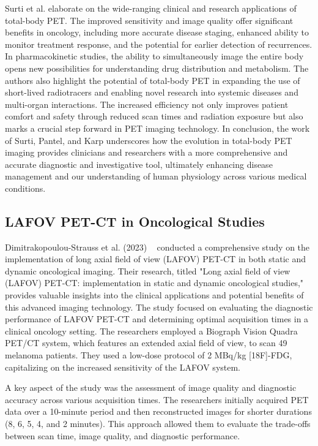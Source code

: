 Surti et al. \cite{surti2020} elaborate on the wide-ranging clinical and research applications of total-body PET. The improved sensitivity and image quality offer significant benefits in oncology, including more accurate disease staging, enhanced ability to monitor treatment response, and the potential for earlier detection of recurrences. In pharmacokinetic studies, the ability to simultaneously image the entire body opens new possibilities for understanding drug distribution and metabolism.
The authors also highlight the potential of total-body PET in expanding the use of short-lived radiotracers and enabling novel research into systemic diseases and multi-organ interactions. The increased efficiency not only improves patient comfort and safety through reduced scan times and radiation exposure but also marks a crucial step forward in PET imaging technology.
In conclusion, the work of Surti, Pantel, and Karp underscores how the evolution in total-body PET imaging provides clinicians and researchers with a more comprehensive and accurate diagnostic and investigative tool, ultimately enhancing disease management and our understanding of human physiology across various medical conditions.


\subsection{LAFOV PET-CT in Oncological Studies}

Dimitrakopoulou-Strauss et al. (2023) ~\cite{dimitrakopoulou2023} conducted a comprehensive study on the implementation of long axial field of view (LAFOV) PET-CT in both static and dynamic oncological imaging. Their research, titled "Long axial field of view (LAFOV) PET-CT: implementation in static and dynamic oncological studies," provides valuable insights into the clinical applications and potential benefits of this advanced imaging technology.
The study focused on evaluating the diagnostic performance of LAFOV PET-CT and determining optimal acquisition times in a clinical oncology setting. The researchers employed a Biograph Vision Quadra PET/CT system, which features an extended axial field of view, to scan 49 melanoma patients. They used a low-dose protocol of 2 MBq/kg [18F]-FDG, capitalizing on the increased sensitivity of the LAFOV system.

A key aspect of the study was the assessment of image quality and diagnostic accuracy across various acquisition times. The researchers initially acquired PET data over a 10-minute period and then reconstructed images for shorter durations (8, 6, 5, 4, and 2 minutes). This approach allowed them to evaluate the trade-offs between scan time, image quality, and diagnostic performance.

